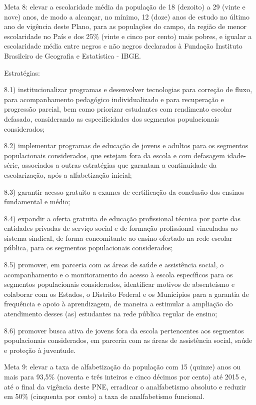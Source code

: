 \documentclass[
]{book}
\begin{document}
Meta 8: elevar a escolaridade média da população de 18 (dezoito) a 29 (vinte e nove) anos, de modo a alcançar, no mínimo, 12 (doze) anos de estudo no último ano de vigência deste Plano, para as populações do campo, da região de menor escolaridade no País e dos 25\% (vinte e cinco por cento) mais pobres, e igualar a escolaridade média entre negros e não negros declarados à Fundação Instituto Brasileiro de Geografia e Estatística - IBGE.

Estratégias:

8.1) institucionalizar programas e desenvolver tecnologias para correção de fluxo, para acompanhamento pedagógico individualizado e para recuperação e progressão parcial, bem como priorizar estudantes com rendimento escolar defasado, considerando as especificidades dos segmentos populacionais considerados;

8.2) implementar programas de educação de jovens e adultos para os segmentos populacionais considerados, que estejam fora da escola e com defasagem idade-série, associados a outras estratégias que garantam a continuidade da escolarização, após a alfabetização inicial;

8.3) garantir acesso gratuito a exames de certificação da conclusão dos ensinos fundamental e médio;

8.4) expandir a oferta gratuita de educação profissional técnica por parte das entidades privadas de serviço social e de formação profissional vinculadas ao sistema sindical, de forma concomitante ao ensino ofertado na rede escolar pública, para os segmentos populacionais considerados;

8.5) promover, em parceria com as áreas de saúde e assistência social, o acompanhamento e o monitoramento do acesso à escola específicos para os segmentos populacionais considerados, identificar motivos de absenteísmo e colaborar com os Estados, o Distrito Federal e os Municípios para a garantia de frequência e apoio à aprendizagem, de maneira a estimular a ampliação do atendimento desses (as) estudantes na rede pública regular de ensino;

8.6) promover busca ativa de jovens fora da escola pertencentes aos segmentos populacionais considerados, em parceria com as áreas de assistência social, saúde e proteção à juventude.

Meta 9: elevar a taxa de alfabetização da população com 15 (quinze) anos ou mais para 93,5\% (noventa e três inteiros e cinco décimos por cento) até 2015 e, até o final da vigência deste PNE, erradicar o analfabetismo absoluto e reduzir em 50\% (cinquenta por cento) a taxa de analfabetismo funcional.
\end{document}
